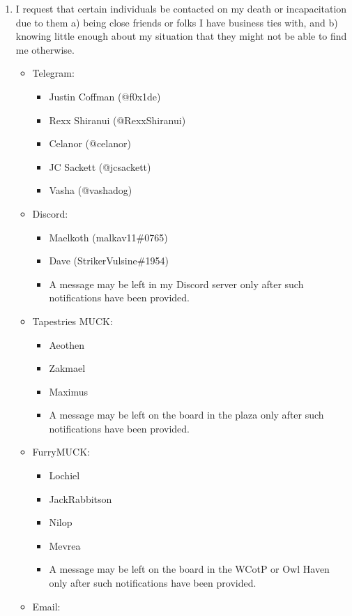 \begin{enumerate}
\def\labelenumi{\arabic{enumi}.}
\tightlist
\item
  I request that certain individuals be contacted on my death or incapacitation due to them a) being close friends or folks I have business ties with, and b) knowing little enough about my situation that they might not be able to find me otherwise.

  \begin{itemize}
  \tightlist
  \item
    Telegram:

    \begin{itemize}
    \tightlist
    \item
      Justin Coffman (@f0x1de)
    \item
      Rexx Shiranui (@RexxShiranui)
    \item
      Celanor (@celanor)
    \item
      JC Sackett (@jcsackett)
    \item
      Vasha (@vashadog)
    \end{itemize}
  \item
    Discord:

    \begin{itemize}
    \tightlist
    \item
      Maelkoth (malkav11\#0765)
    \item
      Dave (StrikerVulsine\#1954)
    \item
      A message may be left in my Discord server only after such notifications have been provided.
    \end{itemize}
  \item
    Tapestries MUCK:

    \begin{itemize}
    \tightlist
    \item
      Aeothen
    \item
      Zakmael
    \item
      Maximus
    \item
      A message may be left on the board in the plaza only after such notifications have been provided.
    \end{itemize}
  \item
    FurryMUCK:

    \begin{itemize}
    \tightlist
    \item
      Lochiel
    \item
      JackRabbitson
    \item
      Nilop
    \item
      Mevrea
    \item
      A message may be left on the board in the WCotP or Owl Haven only after such notifications have been provided.
    \end{itemize}
  \item
    Email:


\end{itemize}
\end{enumerate}
